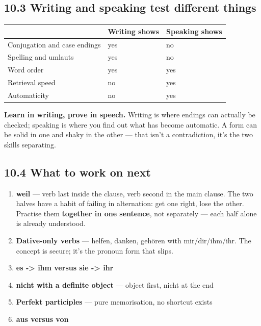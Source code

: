 \documentclass[
  11pt,
]{article}
\newcounter{none} %
\providecommand{\tightlist}{%
  \setlength{\itemsep}{0pt}\setlength{\parskip}{0pt}}
\begin{document}
\subsection{10.3 Writing and speaking test different
things}\label{writing-and-speaking-test-different-things}

{\def\LTcaptype{none} %
\begin{longtable}[]{@{}lll@{}}
\toprule\noalign{}
& Writing shows & Speaking shows \\
\midrule\noalign{}
\endhead
\bottomrule\noalign{}
\endlastfoot
Conjugation and case endings & yes & no \\
Spelling and umlauts & yes & no \\
Word order & yes & yes \\
Retrieval speed & no & yes \\
Automaticity & no & yes \\
\end{longtable}
}

\textbf{Learn in writing, prove in speech.} Writing is where endings can
actually be checked; speaking is where you find out what has become
automatic. A form can be solid in one and shaky in the other --- that
isn't a contradiction, it's the two skills separating.

\subsection{10.4 What to work on next}\label{what-to-work-on-next}

\begin{enumerate}
\def\labelenumi{\arabic{enumi}.}
\tightlist
\item
  \textbf{weil} --- verb last inside the clause, verb second in the main
  clause. The two halves have a habit of failing in alternation: get one
  right, lose the other. Practise them \textbf{together in one
  sentence}, not separately --- each half alone is already understood.
\item
  \textbf{Dative-only verbs} --- helfen, danken, gehören with
  mir/dir/ihm/ihr. The concept is secure; it's the pronoun form that
  slips.
\item
  \textbf{es -\textgreater{} ihm versus sie -\textgreater{} ihr}
\item
  \textbf{nicht with a definite object} --- object first, nicht at the
  end
\item
  \textbf{Perfekt participles} --- pure memorisation, no shortcut exists
\item
  \textbf{aus versus von}
\end{enumerate}
\end{document}
